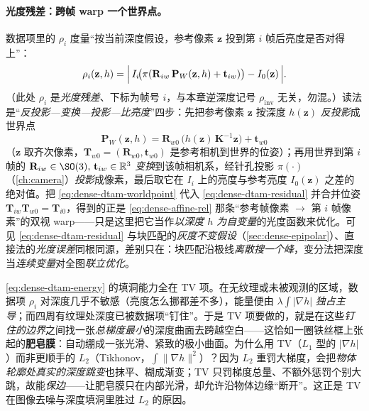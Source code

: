 \paragraph{光度残差：跨帧 warp 一个世界点。}
数据项里的 $\rho_i$ 度量“按当前深度假设，参考像素 $\mathbf{z}$ 投到第 $i$ 帧后亮度是否对得上”\cite{carlone2026handbook}：
\begin{equation}
  \rho_i(\mathbf{z},h)=\Bigl|\,I_i\!\bigl(\pi(\mathbf{R}_{iw}\,\mathbf{P}_W(\mathbf{z},h)+\mathbf{t}_{iw})\bigr)-I_0(\mathbf{z})\,\Bigr|.
  \label{eq:dense-dtam-residual}
\end{equation}
（此处 $\rho_i$ 是\emph{光度残差}、下标为帧号 $i$，与本章逆深度记号 $\rho_{\mathrm{inv}}$ 无关，勿混。）读法是“\emph{反投影—变换—投影—比亮度}”四步：先把参考像素 $\mathbf{z}$ 按深度 $h(\mathbf{z})$ \emph{反投影}成世界点
\begin{equation}
  \mathbf{P}_W(\mathbf{z},h)=\mathbf{R}_{w0}\,\bigl(h(\mathbf{z})\,\mathbf{K}^{-1}\mathbf{z}\bigr)+\mathbf{t}_{w0}
  \label{eq:dense-dtam-worldpoint}
\end{equation}
（$\mathbf{z}$ 取齐次像素，$\mathbf{T}_{w0}=(\mathbf{R}_{w0},\mathbf{t}_{w0})$ 是参考相机到世界的位姿）；再用世界到第 $i$ 帧的 $\mathbf{R}_{iw}\in\SO(3),\,\mathbf{t}_{iw}\in\mathbb{R}^3$ \emph{变换}到该帧相机系，经针孔投影 $\pi(\cdot)$（\cref{ch:camera}）\emph{投影}成像素，最后取它在 $I_i$ 上的亮度与参考亮度 $I_0(\mathbf{z})$ 之差的绝对值。把 \cref{eq:dense-dtam-worldpoint} 代入 \cref{eq:dense-dtam-residual} 并合并位姿 $\mathbf{T}_{iw}\mathbf{T}_{w0}=\mathbf{T}_{i0}$，得到的正是 \cref{eq:dense-affine-rel} 那条“参考帧像素 $\to$ 第 $i$ 帧像素”的双视 warp——只是这里把它当作\emph{以深度 $h$ 为自变量}的光度函数来优化。可见 \cref{eq:dense-dtam-residual} 与块匹配的\emph{灰度不变假设}（\cref{sec:dense-epipolar}）、直接法的\emph{光度误差}同根同源，差别只在：块匹配沿极线\emph{离散搜一个峰}，变分法把深度当\emph{连续变量}对全图\emph{联立优化}。

\begin{insight}\label{ins:dense-dtam-soapfilm}
\cref{eq:dense-dtam-energy} 的填洞能力全在 TV 项。在无纹理或未被观测的区域，数据项 $\rho_i$ 对深度几乎不敏感（亮度怎么挪都差不多），能量便由 $\lambda\int|\nabla h|$ \emph{独占主导}；而四周有纹理处深度已被数据项“钉住”。于是 TV 项要做的，就是在这些\emph{钉住的边界}之间找一张\emph{总梯度最小}的深度曲面去跨越空白——这恰如一圈铁丝框上张起的\textbf{肥皂膜}：自动绷成一张光滑、紧致的极小曲面\cite{carlone2026handbook}。为什么用 TV（$L_1$ 型的 $|\nabla h|$）而非更顺手的 $L_2$（Tikhonov，$\int\|\nabla h\|^2$）？因为 $L_2$ 重罚大梯度，会把\emph{物体轮廓处真实的深度跳变}也抹平、糊成渐变；TV 只罚梯度总量、不额外惩罚个别大跳，故能\emph{保边}——让肥皂膜只在内部光滑，却允许沿物体边缘“断开”。这正是 TV 在图像去噪与深度填洞里胜过 $L_2$ 的原因。
\end{insight}

